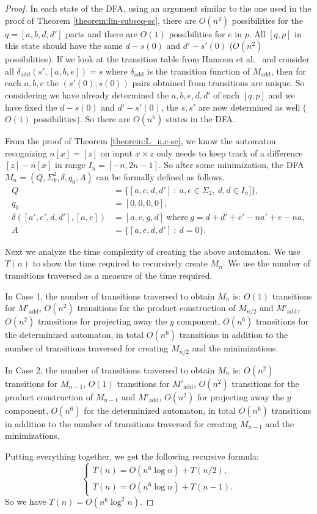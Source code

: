 \documentclass[12pt,reqno]{article}
\def\suchthat{\ : \ }
\DeclareMathOperator{\add}{add}
\begin{document}
\begin{proof}
In each state of the DFA, using an argument similar to the one used in the proof of Theorem \ref{theorem:lin-subseq-sc}, there are $O(n^4)$ possibilities for the $q=[a, b, d, d']$ parts and there are $O(1)$ possibilities for $e$ in $p$.
All $[q, p]$ in this state should have the same $d-s(0)$ and $d'-s'(0)$ ($O(n^2)$ possibilities).
If we look at the transition table from Hamoon et al.~\cite{mousavi_decision_2016} and consider all $\delta_{\add}(s', [a, b, e])=s$ where $\delta_{\add}$ is the transition function of $M_{\add}$, then for each $a, b, e$ the $(s'(0), s(0))$ pairs obtained from transitions are unique. So considering we have already determined the $a, b, e, d, d'$ of each $[q, p]$ and we have fixed the $d-s(0)$ and $d'-s'(0)$, the $s, s'$ are now determined as well ($O(1)$ possibilities). So there are $O(n^6)$ states in the DFA.



From the proof of Theorem \ref{theorem:L_n,c-sc}, we know the automaton recognizing $n[x]= [z]$ on input $x \times z$ only needs to keep track of a difference $[z] - n[x]$ in range $I_n = [-n, 2n-1]$. So after some minimization, the DFA  $M_{n}=(Q, \Sigma^2_k, \delta, q_0, A)$ can be formally defined as follows.
\begin{align*}
Q &= \{ [a, e, d, d']  \suchthat a, e \in \Sigma_2, \ d, d \in I_n] \}, \\
q_0 &= [0, 0, 0, 0], \\
\delta([a', e', d, d'], [a, e]) &= [a, e, g, d] \ \text{where} \ g = d +d' + e'-na' +e -na,
 \\
A &= \{[a, e, d, d'] \suchthat d=0\}.
\end{align*}

Next we analyze the time complexity of creating the above automaton. We use $T(n)$ to show the time required to recursively create $M_n$. We use the number of transitions traversed as a measure of the time required.

In Case 1, the number of transitions traversed to obtain $M_n$ is: $O(1)$ transitions for $M'_{\add}$, $O(n^2)$ transitions for the product construction of $M_{n/2}$ and $M'_{\add}$, $O(n^2)$ transitions for projecting away the $y$ component, $O(n^6)$ transitions for the determinized automaton, in total $O(n^6)$ transitions in addition to the number of transitions traversed for creating $M_{n/2}$ and the minimizations.

In Case 2, the number of transitions traversed to obtain $M_n$ is: $O(n^2)$ transitions for $M_{n-1}$, $O(1)$ transitions for $M'_{\add}$, $O(n^2)$ transitions for the product construction of $M_{n-1}$ and $M'_{\add}$, $O(n^2)$ for projecting away the $y$ component, $O(n^6)$ for the determinized automaton, in total $O(n^6)$ transitions in addition to the number of transitions traversed for creating $M_{n-1}$ and the minimizations.

Putting everything together, we get the following recursive formula:
\[
\begin{cases}
    T(n) = O(n^6\log n) + T(n/2), \\
    T(n) = O(n^6 \log n) + T(n-1).
\end{cases}
\]
So we have $T(n) = O(n^6\log^2 n)$.
\end{proof}
\end{document}
